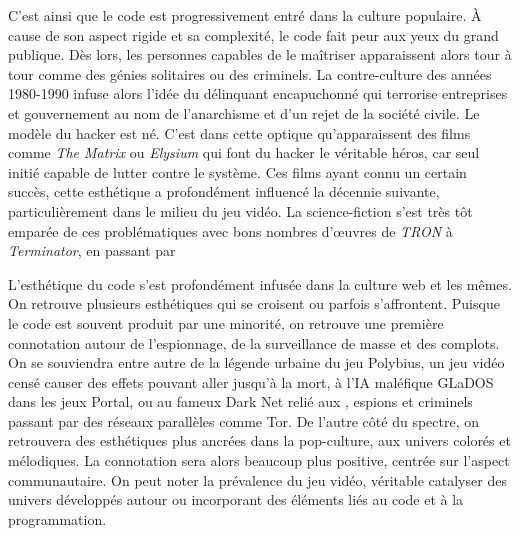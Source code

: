 \documentclass[12pt]{article} %
\begin{document}
C'est ainsi que le code est progressivement entré dans la culture populaire. À cause de son aspect rigide et sa complexité, le code fait peur aux yeux du grand publique. Dès lors, les personnes capables de le maîtriser apparaissent alors tour à tour comme des génies solitaires ou des criminels. La contre-culture des années 1980-1990 infuse alors l'idée du délinquant encapuchonné qui terrorise entreprises et gouvernement au nom de l'anarchisme et d'un rejet de la société civile. Le modèle du hacker est né. C'est dans cette optique qu'apparaissent des films comme \textit{The Matrix} ou \textit{Elysium} qui font du hacker le véritable héros, car seul initié capable de lutter contre le système. Ces films ayant connu un certain succès, cette esthétique a profondément influencé la décennie suivante, particulièrement dans le milieu du jeu vidéo. La science-fiction s'est très tôt emparée de ces problématiques avec bons nombres d'œuvres de \textit{TRON} à \textit{Terminator}, en passant par 

L'esthétique du code s'est profondément infusée dans la culture web et les mêmes. On retrouve plusieurs esthétiques qui se croisent ou parfois s'affrontent. Puisque le code est souvent produit par une minorité, on retrouve une première connotation autour de l'espionnage, de la surveillance de masse et des complots. On se souviendra entre autre de la légende urbaine du jeu Polybius, un jeu vidéo censé causer des effets pouvant aller jusqu'à la mort, à l'IA maléfique GLaDOS dans les jeux Portal, ou au fameux Dark Net relié aux , espions et criminels passant par des réseaux parallèles comme Tor. De l'autre côté du spectre, on retrouvera des esthétiques plus ancrées dans la pop-culture, aux univers colorés et mélodiques. La connotation sera alors beaucoup plus positive, centrée sur l'aspect communautaire. On peut noter la prévalence du jeu vidéo, véritable catalyser des univers développés autour ou incorporant des éléments liés au code et à la programmation.
\end{document}
